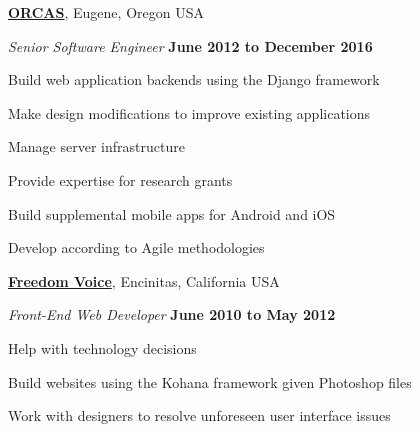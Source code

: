 \documentclass[11pt]{article}
\newenvironment{outerlist}[1][\enskip\textbullet]%
        {\begin{itemize}[#1]}{\end{itemize}%
         \vspace{-.6\baselineskip}}
\newenvironment{innerlist}[1][\enskip\textbullet]%
        {\begin{compactitem}[#1]}{\end{compactitem}}
\newcommand{\blankline}{\quad\pagebreak[2]}
\begin{document}
\href{http://www.orcasinc.com/}{\textbf{ORCAS}},
Eugene, Oregon USA
\begin{outerlist}

    \item[] \textit{Senior Software Engineer}%
            \hfill \textbf{June 2012 to December 2016}
    \begin{innerlist}
         \item Build web application backends using the Django framework
         \item Make design modifications to improve existing applications
         \item Manage server infrastructure
         \item Provide expertise for research grants
         \item Build supplemental mobile apps for Android and iOS
         \item Develop according to Agile methodologies
    \end{innerlist}
\end{outerlist}

\blankline

\href{http://www.freedomvoice.com/}{\textbf{Freedom Voice}},
Encinitas, California USA
\begin{outerlist}

    \item[] \textit{Front-End Web Developer}%
            \hfill \textbf{June 2010 to May 2012}
    \begin{innerlist}
         \item Help with technology decisions
         \item Build websites using the Kohana framework given Photoshop files
         \item Work with designers to resolve unforeseen user interface issues
    \end{innerlist}
\end{outerlist}

\blankline
\end{document}
